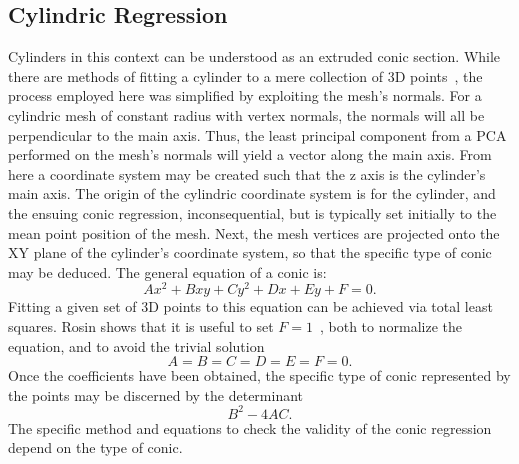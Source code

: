 \subsection{Cylindric Regression}
Cylinders in this context can be understood as an extruded conic section.
While there are methods of fitting a cylinder to a mere collection of 3D points~\cite{PCL_cyl_regression}, the process employed here was simplified by exploiting the mesh's normals.
For a cylindric mesh of constant radius with vertex normals, the normals will all be perpendicular to the main axis.
Thus, the least principal component from a PCA performed on the mesh's normals will yield a vector along the main axis.
From here a coordinate system may be created such that the z axis is the cylinder's main axis.
The origin of the cylindric coordinate system is for the cylinder, and the ensuing conic regression, inconsequential, but is typically set initially to the mean point position of the mesh.
Next, the mesh vertices are projected onto the XY plane of the cylinder's coordinate system, so that the specific type of conic may be deduced.
The general equation of a conic is:
\begin{equation}\label{eq:gen_conic}
	Ax^2 + Bxy + Cy^2 + Dx + Ey + F = 0.
\end{equation}
Fitting a given set of 3D points to this equation can be achieved via total least squares.
Rosin shows that it is useful to set $F=1$~\cite{Ellipse_least_squares}, both to normalize the equation, and to avoid the trivial solution
\begin{equation*}
	A = B = C = D = E = F = 0.
\end{equation*}
Once the coefficients have been obtained, the specific type of conic represented by the points may be discerned by the determinant
\begin{equation*}
	B^2 - 4AC.
\end{equation*}
The specific method and equations to check the validity of the conic regression depend on the type of conic.

